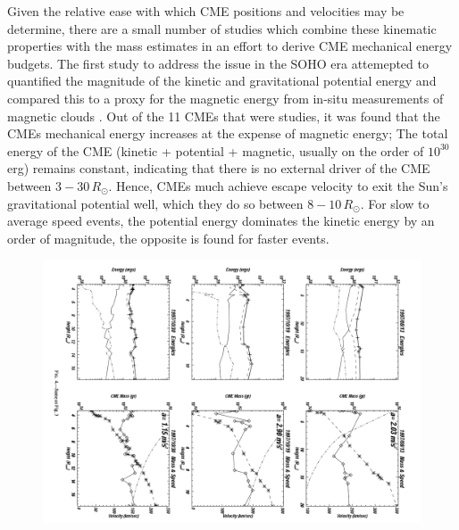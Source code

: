 
Given the relative ease with which CME positions and velocities may be determine, there are a small number of studies which combine these kinematic properties with the mass estimates in an effort to derive CME mechanical energy budgets. The first study to address the issue in the SOHO era attemepted to quantified the magnitude of the kinetic and gravitational potential energy and compared this to a proxy for the magnetic energy from in-situ measurements of magnetic clouds \citep{vou00}. Out of the 11 CMEs that were studies, it was found that the CMEs mechanical energy increases at the expense of magnetic energy; The total energy of the CME (kinetic + potential + magnetic, usually on the order of $10^{30}$\,erg) remains constant, indicating that there is no external driver of the CME between $3-30\,R_{\odot}$. Hence, CMEs much achieve escape velocity to exit the Sun's gravitational potential well, which they do so between $8-10\,R_{\odot}$. For slow to average speed events, the potential energy dominates the kinetic energy by an order of magnitude, the opposite is found for faster events. 
\begin{figure}[h!]
\begin{center}
\includegraphics[scale=0.45, angle=90]{images/cme_energies}
\caption{\citep{vou00}}
\end{center}
\label{fig:cme_energies}
\end{figure}
\clearpage

